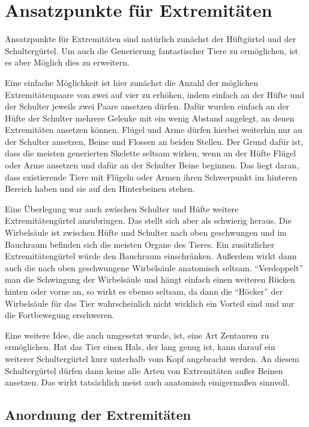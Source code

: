 \section{Ansatzpunkte für Extremitäten}

Ansatzpunkte für Extremitäten sind natürlich zunächst der Hüftgürtel und der Schultergürtel. Um auch die Generierung fantastischer Tiere zu ermöglichen, ist es aber Möglich dies zu erweitern.

Eine einfache Möglichkeit ist hier zunächst die Anzahl der möglichen Extremitätenpaare von zwei auf vier zu erhöhen, indem einfach an der Hüfte und der Schulter jeweils zwei Paare ansetzen dürfen. Dafür wurden einfach an der Hüfte \bzw der Schulter mehrere Gelenke mit ein wenig Abstand angelegt, an denen Extremitäten ansetzen können.
Flügel und Arme dürfen hierbei weiterhin nur an der Schulter ansetzen, Beine und Flossen an beiden Stellen. Der Grund dafür ist, dass die meisten generierten Skelette seltsam wirken, wenn an der Hüfte Flügel oder Arme ansetzen und dafür an der Schulter Beine beginnen. Das liegt daran, dass existierende Tiere mit Flügeln oder Armen ihren Schwerpunkt im hinteren Bereich haben und sie auf den Hinterbeinen stehen.

Eine Überlegung war auch zwischen Schulter und Hüfte weitere Extremitätengürtel anzubringen. Das stellt sich aber als schwierig heraus. Die Wirbelsäule ist zwischen Hüfte und Schulter nach oben geschwungen und im Bauchraum befinden sich die meisten Organe des Tieres. Ein zusätzlicher Extremitätengürtel würde den Bauchraum einschränken. Außerdem wirkt dann auch die nach oben geschwungene Wirbelsäule anatomisch seltsam.
"`Verdoppelt"' man die Schwingung der Wirbelsäule und hängt einfach einen weiteren Rücken hinten oder vorne an, so wirkt es ebenso seltsam, da dann die "`Höcker"' der Wirbelsäule für das Tier wahrscheinlich nicht wirklich ein Vorteil sind und nur die Fortbewegung erschweren.

Eine weitere Idee, die auch umgesetzt wurde, ist, eine Art Zentauren zu ermöglichen. Hat das Tier einen Hals, der lang genug ist, kann darauf ein weiterer Schultergürtel kurz unterhalb vom Kopf angebracht werden. An diesem Schultergürtel dürfen dann keine alle Arten von Extremitäten außer Beinen ansetzen. Das wirkt tatsächlich meist auch anatomisch einigermaßen sinnvoll.

\subsection{Anordnung der Extremitäten}

